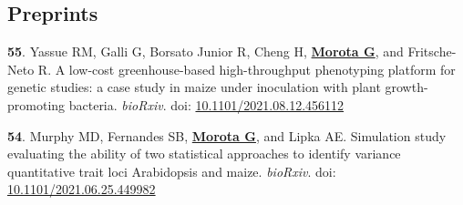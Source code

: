 \documentclass[margin,line,10pt]{res}
\newenvironment{list1}{
  \begin{list}{\ding{113}}{%
      \setlength{\itemsep}{0in}
      \setlength{\parsep}{0in} \setlength{\parskip}{0in}
      \setlength{\topsep}{0in} \setlength{\partopsep}{0in} 
      \setlength{\leftmargin}{0.17in}}}{\end{list}}
\begin{document}
\begin{resume}
\begin{comment}
\vspace{0.5cm}
\section{\sc Manuscripts under review}

\begin{list1}

        
  \item  [{\bf 29}.]  Rovadoscki GA, Pertille SFN, Moreira GCM, P{\'e}rtille F,  Botelho AA, Cesar ASM, Petrini J, Gerv{\'a}sio IC, Dauria BD, \textbf{\underline{Morota G}}, Spangler ML, Pinto LFB, de Carvalho GGP, Lanna DPD, Coutinho LL, and Mour{\~a}o GB. Estimates of genomic heritability and genome-wide association study for meat quality traits in Santa In{\^e}s sheep. \emph{animal}

  \item  [{\bf 28}.]  Mamani GCM, Santana BF, Oliveira Junior GA,  Mattos EC, Eler JP, Ventura RV, \textbf{\underline{Morota G}}, and Ferraz JBS  \emph{PLoS ONE}.     

    
    \end{list1}
\end{comment}


\vspace{0.5cm}
\section{\sc Preprints}
\begin{list1}

     \item [{\bf 55}.] Yassue RM, Galli G, Borsato Junior R, Cheng H, \textbf{\underline{Morota G}}, and Fritsche-Neto R. A low-cost greenhouse-based high-throughput phenotyping platform for genetic studies: a case study in maize under inoculation with plant growth-promoting bacteria. \emph{bioRxiv}. doi: \textcolor{blue}{\href{https://doi.org/10.1101/2021.08.12.456112}{10.1101/2021.08.12.456112}}  

       
             \vspace{0.5cm}

             
   \item [{\bf 54}.] Murphy MD, Fernandes SB, \textbf{\underline{Morota G}}, and Lipka AE. Simulation study evaluating the ability of two statistical approaches to identify variance quantitative trait loci Arabidopsis and maize. \emph{bioRxiv}. doi: \textcolor{blue}{\href{https://doi.org/10.1101/2021.06.25.449982}{10.1101/2021.06.25.449982}}  



\end{list1}
\end{resume}
\end{document}
